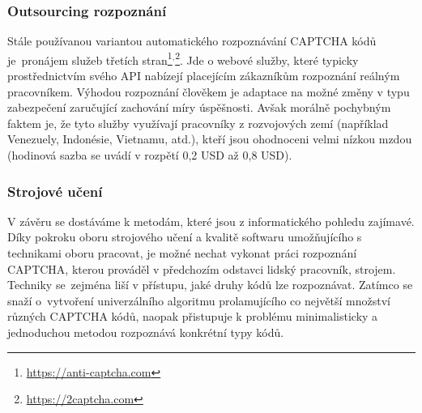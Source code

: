 \documentclass[
  field=ainfp,
  master=true,
  biblatex,
  sourcecodes=false,
  theorems=false,
  glossaries,
  index
]{kidiplom}
\begin{document}
\subsubsection*{Outsourcing rozpoznání}
Stále používanou variantou automatického rozpoznávání CAPTCHA kódů je~pro\-nájem služeb třetích stran\footnote{\url{https://anti-captcha.com}}$^{,}$\footnote{\url{https://2captcha.com}}. Jde o webové služby, které typicky prostřednictvím svého API nabízejí placejícím zákazníkům rozpoznání reálným pracovníkem. Výhodou rozpoznání člověkem je adaptace na možné změny v typu zabez\-pe\-čení zaručující zachování míry úspěšnosti. Avšak morálně pochybným faktem je, že tyto služby využívají pracovníky z rozvojových zemí (například Venezuely, Indonésie, Vietnamu, atd.), kteří jsou ohodnoceni velmi nízkou mzdou (hodinová sazba se uvádí v rozpětí 0,2 USD až 0,8 USD). 

\subsubsection*{Strojové učení}
V závěru se dostáváme k metodám, které jsou z informatického pohledu zajímavé. Díky pokroku oboru strojového učení a kvalitě softwaru umožňujícího s technikami oboru pracovat, je možné nechat vykonat práci rozpoznání CAPTCHA, kterou prováděl v předchozím odstavci lidský pracovník, strojem. Techniky se~zejména liší v přístupu, jaké druhy kódů lze rozpoznávat. Zatímco \cite{43464} se snaží o~vytvoření univerzálního algoritmu prolamujícího co největší množství různých CAPTCHA kódů, \citep{Kopp2016HowTM} naopak přistupuje k problému minimalisticky a jednoduchou metodou rozpoznává konkrétní typy kódů.
\newpage
\end{document}
